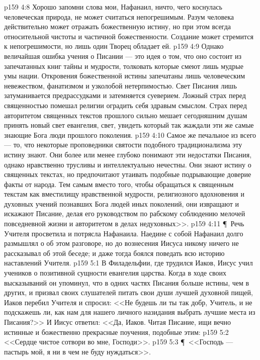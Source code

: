 \vs p159 4:8 Хорошо запомни слова мои, Нафанаил, ничто, чего коснулась человеческая природа, не может считаться непогрешимым. Разум человека действительно может отражать божественную истину, но при этом всегда относительной чистоты и частичной божественности. Создание может стремится к непогрешимости, но лишь один Творец обладает ей.
\vs p159 4:9 Однако величайшая ошибка учения о Писании --- это идея о том, что оно состоит из запечатанных книг тайны и мудрости, толковать которые смеют лишь мудрые умы нации. Откровения божественной истины запечатаны лишь человеческим невежеством, фанатизмом и узколобой нетерпимостью. Свет Писания лишь затуманивается предрассудками и затемняется суеверием. Ложный страх перед священностью помешал религии оградить себя здравым смыслом. Страх перед авторитетом священных текстов прошлого сильно мешает сегодняшним душам принять новый свет евангелия, свет, увидеть который так жаждали эти же самые знающие Бога люди прошлого поколения.
\vs p159 4:10 Самое же печальное из всего --- то, что некоторые проповедники святости подобного традиционализма эту истину знают. Они более или менее глубоко понимают эти недостатки Писания, однако нравственно трусливы и интеллектуально нечестны. Они знают истину о священных текстах, но предпочитают утаивать подобные подрывающие доверие факты от народа. Тем самым вместо того, чтобы обращаться к священным текстам как вместилищу нравственной мудрости, религиозного вдохновения и духовных учений познавших Бога людей иных поколений, они извращают и искажают Писание, делая его руководством по рабскому соблюдению мелочей повседневной жизни и авторитетом в делах недуховных>>.
\vs p159 4:11 \P\ Речь Учителя просветила и потрясла Нафанаила. Наедине с собой Нафанаил долго размышлял о об этом разговоре, но до вознесения Иисуса никому ничего не рассказывал об этой беседе; и даже тогда боялся поведать всю историю наставлений Учителя.
\vs p159 5:1 В Филадельфии, где трудился Иаков, Иисус учил учеников о позитивной сущности евангелия царства. Когда в ходе своих высказываний он упоминул, что в одних частях Писания больше истины, чем в других, и призвал своих слушателей питать свои души лучшей духовной пищей, Иаков перебил Учителя и спросил: <<Не будешь ли ты так добр, Учитель, и не подскажешь ли, как нам для нашего личного назидания выбрать лучшие места из Писания?>> И Иисус ответил: <<Да, Иаков. Читая Писание, ищи вечно истинные и божественно прекрасные поучения, подобные этим:
\vs p159 5:2 <<Сердце чистое сотвори во мне, Господи>>.
\vs p159 5:3 \P\ <<Господь --- пастырь мой, я ни в чем не буду нуждаться>>.

